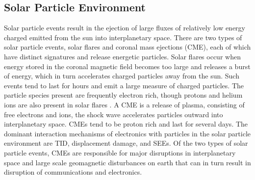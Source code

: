 \subsection{Solar Particle Environment} %
\label{sub:solar_wind}
Solar particle events result in the ejection of large fluxes of relatively low energy charged emitted from the sun into interplanetary space.
There are two types of solar particle events, solar flares and coronal mass ejections (CME), each of which have distinct signatures and release energetic particles.
Solar flares occur when energy stored in the coronal magnetic field becomes too large and releases a burst of energy, which in turn accelerates charged particles away from the sun.
Such events tend to last for hours and emit a large measure of charged particles.
The particle species present are frequently electron rich, though protons and helium ions are also present in solar flares \cite{xapsos:2006}.
A CME is a release of plasma, consisting of free electrons and ions, the shock wave accelerates particles outward into interplanetary space.
CMEs tend to be proton rich and last for several days.
The dominant interaction mechanisms of electronics with particles in the solar particle environment are TID, displacement damage, and SEEs.
Of the two types of solar particle events, CMEs are responsible for major disruptions in interplanetary space and large scale geomagnetic disturbances on earth that can in turn result in disruption of communications and electronics.

